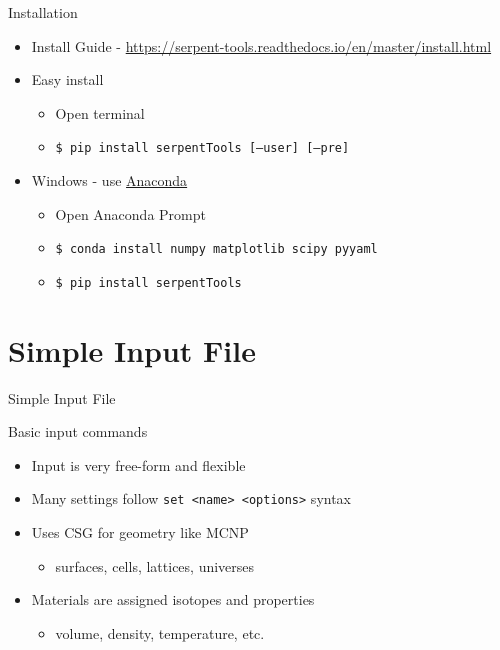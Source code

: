 \documentclass{beamer}
\begin{document}
\begin{frame}{Installation}
    \begin{itemize}
        \item Install Guide - \url{https://serpent-tools.readthedocs.io/en/master/install.html}
        \item Easy install
            \begin{itemize}
                \item Open terminal
                \item \texttt{\$ pip install serpentTools [--user] [--pre]}
            \end{itemize}
        \item Windows - use \href{https://www.anaconda.com/distribution/}{Anaconda}
            \begin{itemize}
                \item Open Anaconda Prompt
                \item \texttt{\$ conda install numpy matplotlib scipy pyyaml}
                \item \texttt{\$ pip install serpentTools}
            \end{itemize}
    \end{itemize}
\end{frame}

\section{Simple Input File}

\begin{frame}{Simple Input File}
    \tableofcontents[sectionstyle=show/hide,subsectionstyle=show/show/hide]
\end{frame}

\begin{frame}{Basic input commands}
    \begin{itemize}
        \item Input is very free-form and flexible
        \item Many settings follow \texttt{set <name> <options>} syntax
        \item Uses CSG for geometry like MCNP
        \begin{itemize}
            \item surfaces, cells, lattices, universes
        \end{itemize}
        \item Materials are assigned isotopes and properties
        \begin{itemize}
            \item volume, density, temperature, etc.
        \end{itemize}
    \end{itemize}
\end{frame}
\end{document}
